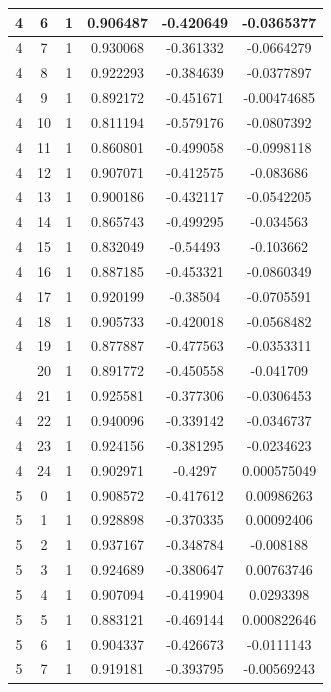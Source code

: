 \documentclass[12pt,a4paper]{article}
\numberwithin{equation}{section}
\numberwithin{figure}{section}
\numberwithin{table}{section}
\begin{document}
\begin{longtable}{|c|c|c|c|c|c|}
4 & 6 & 1 & 0.906487 & -0.420649 & -0.0365377 \\ \hline
4 & 7 & 1 & 0.930068 & -0.361332 & -0.0664279 \\ \hline
4 & 8 & 1 & 0.922293 & -0.384639 & -0.0377897 \\ \hline
4 & 9 & 1 & 0.892172 & -0.451671 & -0.00474685 \\ \hline
4 & 10 & 1 & 0.811194 & -0.579176 & -0.0807392 \\ \hline
4 & 11 & 1 & 0.860801 & -0.499058 & -0.0998118 \\ \hline
4 & 12 & 1 & 0.907071 & -0.412575 & -0.083686 \\ \hline
4 & 13 & 1 & 0.900186 & -0.432117 & -0.0542205 \\ \hline
4 & 14 & 1 & 0.865743 & -0.499295 & -0.034563 \\ \hline
4 & 15 & 1 & 0.832049 & -0.54493 & -0.103662 \\ \hline
4 & 16 & 1 & 0.887185 & -0.453321 & -0.0860349 \\ \hline
4 & 17 & 1 & 0.920199 & -0.38504 & -0.0705591 \\ \hline
4 & 18 & 1 & 0.905733 & -0.420018 & -0.0568482 \\ \hline
4 & 19 & 1 & 0.877887 & -0.477563 & -0.0353311 \\ \hline
\pagebreak
4 & 20 & 1 & 0.891772 & -0.450558 & -0.041709 \\ \hline
4 & 21 & 1 & 0.925581 & -0.377306 & -0.0306453 \\ \hline
4 & 22 & 1 & 0.940096 & -0.339142 & -0.0346737 \\ \hline
4 & 23 & 1 & 0.924156 & -0.381295 & -0.0234623 \\ \hline
4 & 24 & 1 & 0.902971 & -0.4297 & 0.000575049 \\ \hline
5 & 0 & 1 & 0.908572 & -0.417612 & 0.00986263 \\ \hline
5 & 1 & 1 & 0.928898 & -0.370335 & 0.00092406 \\ \hline
5 & 2 & 1 & 0.937167 & -0.348784 & -0.008188 \\ \hline
5 & 3 & 1 & 0.924689 & -0.380647 & 0.00763746 \\ \hline
5 & 4 & 1 & 0.907094 & -0.419904 & 0.0293398 \\ \hline
5 & 5 & 1 & 0.883121 & -0.469144 & 0.000822646 \\ \hline
5 & 6 & 1 & 0.904337 & -0.426673 & -0.0111143 \\ \hline
5 & 7 & 1 & 0.919181 & -0.393795 & -0.00569243 \\ \hline

\end{longtable}
\end{document}
